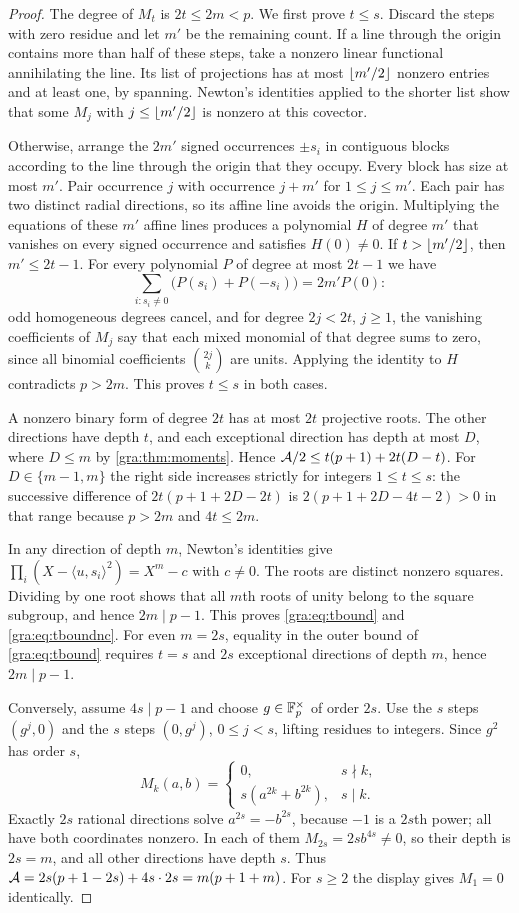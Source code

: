 \begin{proof}
The degree of $M_t$ is $2t\le2m<p$. We first prove $t\le s$. Discard the
steps with zero residue and let $m'$ be the remaining count. If a line
through the origin contains more than half of these steps, take a nonzero
linear functional annihilating the line. Its list of projections has at
most $\lfloor m'/2\rfloor$ nonzero entries and at least one, by spanning. Newton's
identities applied to the shorter list show that some $M_j$ with
$j\le\lfloor m'/2\rfloor$ is nonzero at this covector.

Otherwise, arrange the $2m'$ signed occurrences $\pm s_i$ in contiguous
blocks according to the line through the origin that they occupy. Every
block has size at most $m'$. Pair occurrence $j$ with occurrence $j+m'$
for $1\le j\le m'$. Each pair has two distinct radial directions, so its
affine line avoids the origin. Multiplying the equations of these $m'$
affine lines produces a polynomial $H$ of degree $m'$ that vanishes on
every signed occurrence and satisfies $H(0)\ne0$. If $t>\lfloor m'/2\rfloor$,
then $m'\le2t-1$. For every polynomial $P$ of degree at most $2t-1$ we
have
\[
 \sum_{i:s_i\ne0}\bigl(P(s_i)+P(-s_i)\bigr)=2m'P(0):
\]
odd homogeneous degrees cancel, and for degree $2j<2t$, $j\ge1$, the
vanishing coefficients of $M_j$ say that each mixed monomial of that degree
sums to zero, since all binomial coefficients $\binom{2j}{k}$ are units.
Applying the identity to $H$ contradicts $p>2m$. This proves $t\le s$ in
both cases.

A nonzero binary form of degree $2t$ has at most $2t$ projective roots.
The other directions have depth $t$, and each exceptional direction has
depth at most $D$, where $D\le m$ by \cref{gra:thm:moments}. Hence
$\mathcal{A}/2\le t(p+1)+2t(D-t)$. For $D\in\{m-1,m\}$ the right side increases
strictly for integers $1\le t\le s$: the successive difference of
$2t(p+1+2D-2t)$ is $2(p+1+2D-4t-2)>0$ in that range because $p>2m$ and
$4t\le2m$.

In any direction of depth $m$, Newton's identities give
$\prod_i(X-\langle u,s_i\rangle^2)=X^m-c$ with $c\ne0$. The roots are
distinct nonzero squares. Dividing by one root shows that all $m$th roots
of unity belong to the square subgroup, and hence $2m\mid p-1$. This
proves \eqref{gra:eq:tbound} and \eqref{gra:eq:tboundnc}. For even $m=2s$,
equality in the outer bound of \eqref{gra:eq:tbound} requires $t=s$ and
$2s$ exceptional directions of depth $m$, hence $2m\mid p-1$.

Conversely, assume $4s\mid p-1$ and choose $g\in\mathbb{F}_p^\times$ of order
$2s$. Use the $s$ steps $(g^j,0)$ and the $s$ steps $(0,g^j)$,
$0\le j<s$, lifting residues to integers. Since $g^2$ has order $s$,
\[
 M_k(a,b)=\begin{cases}0,&s\nmid k,\\ s(a^{2k}+b^{2k}),&s\mid k.\end{cases}
\]
Exactly $2s$ rational directions solve $a^{2s}=-b^{2s}$, because $-1$ is a
$2s$th power; all have both coordinates nonzero. In each of them
$M_{2s}=2sb^{4s}\ne0$, so their depth is $2s=m$, and all other directions
have depth $s$. Thus
$\mathcal{A}=2s(p+1-2s)+4s\cdot2s=m(p+1+m)$. For $s\ge2$ the display gives
$M_1=0$ identically.
\end{proof}

